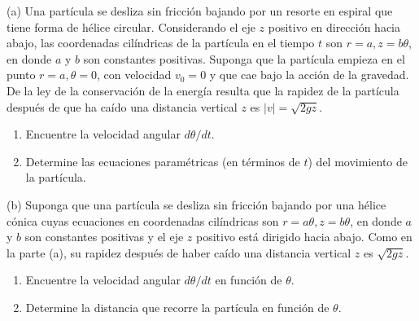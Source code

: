 \item (a) Una partícula se desliza sin fricción bajando por un resorte en espiral que tiene forma de hélice circular. Considerando el eje $z$ positivo en dirección hacia abajo, las coordenadas cilíndricas de la partícula en el tiempo $t$ son $r = a, z = b\theta$, en donde $a$ y $b$ son constantes positivas. Suponga que la partícula empieza en el punto $r = a, \theta = 0$, con velocidad $v_0 = 0$ y que cae bajo la acción de la gravedad. De la ley de la conservación de la energía resulta que la rapidez de la partícula después de que ha caído una distancia vertical $z$ es $|v| = \sqrt{2gz}$.
\begin{enumerate}
    \item[(i)] Encuentre la velocidad angular $d\theta/dt$.
    \item[(ii)] Determine las ecuaciones paramétricas (en términos de $t$) del movimiento de la partícula.
\end{enumerate}

\begin{center}
\end{center}

(b) Suponga que una partícula se desliza sin fricción bajando por una hélice cónica cuyas ecuaciones en coordenadas cilíndricas son $r = a\theta, z = b\theta$, en donde $a$ y $b$ son constantes positivas y el eje $z$ positivo está dirigido hacia abajo. Como en la parte (a), su rapidez después de haber caído una distancia vertical $z$ es $\sqrt{2gz}$.
\begin{enumerate}
    \item[(i)] Encuentre la velocidad angular $d\theta/dt$ en función de $\theta$.
    \item[(ii)] Determine la distancia que recorre la partícula en función de $\theta$.
\end{enumerate}

